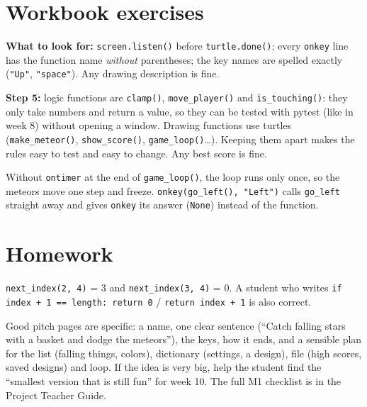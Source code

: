 
\section{Workbook exercises}
\begin{answer}
\textbf{What to look for:} \texttt{screen.listen()} before \texttt{turtle.done()}; every \texttt{onkey} line has the function name \emph{without} parentheses;
the key names are spelled exactly (\texttt{"Up"}, \texttt{"space"}). Any drawing description is fine.
\end{answer}

\begin{answer}
\textbf{Step 5:} logic functions are \texttt{clamp()}, \texttt{move\_player()} and \texttt{is\_touching()}: they only take numbers and return a value, so they
can be tested with pytest (like in week 8) without opening a window. Drawing functions use turtles (\texttt{make\_meteor()}, \texttt{show\_score()},
\texttt{game\_loop()}\ldots). Keeping them apart makes the rules easy to test and easy to change. Any best score is fine.
\end{answer}

\begin{answer}[Reflection]
Without \texttt{ontimer} at the end of \texttt{game\_loop()}, the loop runs only once, so the meteors move one step and freeze.
\texttt{onkey(go\_left(), "Left")} calls \texttt{go\_left} straight away and gives \texttt{onkey} its answer (\texttt{None}) instead of the function.
\end{answer}

\section{Homework}
\begin{answer}
\texttt{next\_index(2, 4)} = 3 and \texttt{next\_index(3, 4)} = 0. A student who writes
\texttt{if index + 1 == length: return 0} / \texttt{return index + 1} is also correct.
\end{answer}

\begin{answer}
Good pitch pages are specific: a name, one clear sentence (\enquote{Catch falling stars with a basket and dodge the meteors}), the keys, how it ends,
and a sensible plan for the list (falling things, colors), dictionary (settings, a design), file (high scores, saved designs) and loop.
If the idea is very big, help the student find the \enquote{smallest version that is still fun} for week 10. The full M1 checklist is in the Project Teacher Guide.
\end{answer}

